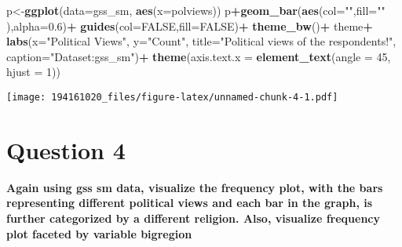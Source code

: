 \documentclass[
]{article}
\newenvironment{Shaded}{\begin{snugshade}}{\end{snugshade}}
\newcommand{\DataTypeTok}[1]{\textcolor[rgb]{0.13,0.29,0.53}{#1}}
\newcommand{\DecValTok}[1]{\textcolor[rgb]{0.00,0.00,0.81}{#1}}
\newcommand{\FloatTok}[1]{\textcolor[rgb]{0.00,0.00,0.81}{#1}}
\newcommand{\KeywordTok}[1]{\textcolor[rgb]{0.13,0.29,0.53}{\textbf{#1}}}
\newcommand{\NormalTok}[1]{#1}
\newcommand{\OperatorTok}[1]{\textcolor[rgb]{0.81,0.36,0.00}{\textbf{#1}}}
\newcommand{\OtherTok}[1]{\textcolor[rgb]{0.56,0.35,0.01}{#1}}
\newcommand{\StringTok}[1]{\textcolor[rgb]{0.31,0.60,0.02}{#1}}
\begin{document}
\begin{Shaded}
\begin{Highlighting}[]
\NormalTok{p<-}\KeywordTok{ggplot}\NormalTok{(}\DataTypeTok{data=}\NormalTok{gss_sm, }\KeywordTok{aes}\NormalTok{(}\DataTypeTok{x=}\NormalTok{polviews))}
\NormalTok{p}\OperatorTok{+}\KeywordTok{geom_bar}\NormalTok{(}\KeywordTok{aes}\NormalTok{(}\DataTypeTok{col=}\StringTok{""}\NormalTok{,}\DataTypeTok{fill=}\StringTok{""}\NormalTok{ ),}\DataTypeTok{alpha=}\FloatTok{0.6}\NormalTok{)}\OperatorTok{+}\StringTok{ }
\StringTok{  }\KeywordTok{guides}\NormalTok{(}\DataTypeTok{col=}\OtherTok{FALSE}\NormalTok{,}\DataTypeTok{fill=}\OtherTok{FALSE}\NormalTok{)}\OperatorTok{+}
\StringTok{  }\KeywordTok{theme_bw}\NormalTok{()}\OperatorTok{+}
\StringTok{  }\NormalTok{theme}\OperatorTok{+}
\StringTok{  }\KeywordTok{labs}\NormalTok{(}\DataTypeTok{x=}\StringTok{"Political Views"}\NormalTok{, }\DataTypeTok{y=}\StringTok{"Count"}\NormalTok{, }
       \DataTypeTok{title=}\StringTok{"Political views of the respondents!"}\NormalTok{, }
       \DataTypeTok{caption=}\StringTok{"Dataset:gss_sm"}\NormalTok{)}\OperatorTok{+}
\StringTok{  }\KeywordTok{theme}\NormalTok{(}\DataTypeTok{axis.text.x =} \KeywordTok{element_text}\NormalTok{(}\DataTypeTok{angle =} \DecValTok{45}\NormalTok{, }\DataTypeTok{hjust =} \DecValTok{1}\NormalTok{))}
\end{Highlighting}
\end{Shaded}

\texttt{[image: 194161020\_files/figure-latex/unnamed-chunk-4-1.pdf]}

\hypertarget{question-4}{%
\section{Question 4}\label{question-4}}

\textbf{Again using gss sm data, visualize the frequency plot, with the
bars representing different political views and each bar in the graph,
is further categorized by a different religion. Also, visualize
frequency plot faceted by variable bigregion}
\end{document}

